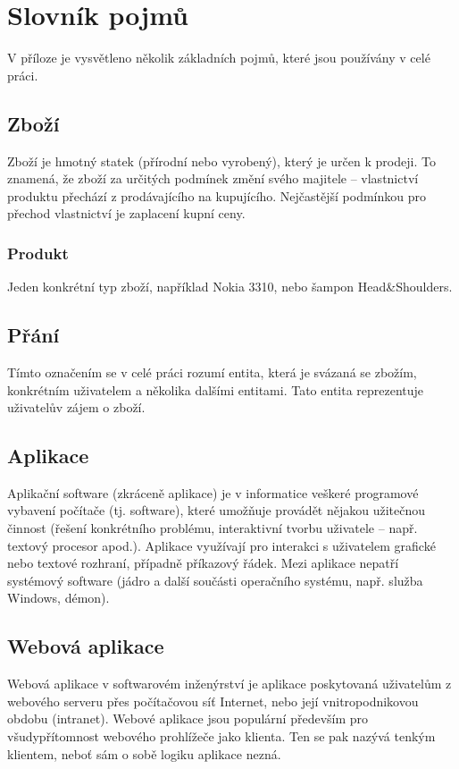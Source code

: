 \chapter{Slovník pojmů}
V příloze je vysvětleno několik základních pojmů, které jsou používány v celé práci.
\section{Zboží}
Zboží je hmotný statek (přírodní nebo vyrobený), který je určen k prodeji. To znamená, že zboží za určitých podmínek změní svého majitele – vlastnictví produktu přechází z prodávajícího na kupujícího. Nejčastější podmínkou pro přechod vlastnictví je zaplacení kupní ceny.
\subsection{Produkt}
Jeden konkrétní typ zboží, například Nokia 3310, nebo šampon Head\&Shoulders.
\section{Přání}
Tímto označením se v celé práci rozumí entita, která je svázaná se zbožím, konkrétním uživatelem a několika dalšími entitami. Tato entita reprezentuje uživatelův zájem o zboží.

\section{Aplikace}
Aplikační software (zkráceně aplikace) je v informatice veškeré programové vybavení počítače (tj. software), které umožňuje provádět nějakou užitečnou činnost (řešení konkrétního problému, interaktivní tvorbu uživatele – např. textový procesor apod.). Aplikace využívají pro interakci s uživatelem grafické nebo textové rozhraní, případně příkazový řádek. Mezi aplikace nepatří systémový software (jádro a další součásti operačního systému, např. služba Windows, démon).

\section{Webová aplikace}
Webová aplikace v softwarovém inženýrství je aplikace poskytovaná uživatelům z webového serveru přes počítačovou síť Internet, nebo její vnitropodnikovou obdobu (intranet). Webové aplikace jsou populární především pro všudypřítomnost webového prohlížeče jako klienta. Ten se pak nazývá tenkým klientem, neboť sám o sobě logiku aplikace nezná.

